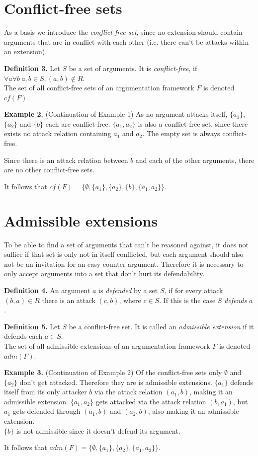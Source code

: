 \documentclass[draft,final]{vutinfth} %
\newcommand{\hl}{\par\vspace{6pt}} %
\newcommand{\cl}{\par\vspace{12pt}} %
\begin{document}
\section{Conflict-free sets}

As a basis we introduce the \emph{conflict-free set}, since no extension should contain arguments that are in conflict with each other (i.e. there can't be attacks within an extension).\cl

\textbf{Definition 3.} Let $S$ be a set of arguments. It is \emph{conflict-free}, if $\forall a \forall b\ a,b\in S, (a,b)\notin R$.\\
The set of all conflict-free sets of an argumentation framework $F$ is denoted $cf(F)$.\cl

\textbf{Example 2.} (Continuation of Example 1) As no argument attacks itself, $\{a_1\}$, $\{a_2\}$ and $\{b\}$ each are conflict-free. $\{a_1,a_2\}$ is also a conflict-free set, since there exists no attack relation containing $a_1$ and $a_2$. The empty set is always conflict-free.\hl
Since there is an attack relation between $b$ and each of the other arguments, there are no other conflict-free sets.\hl
It follows that $cf(F)=\{\emptyset,\{a_1\},\{a_2\},\{b\},\{a_1,a_2\}\}$.\cl

\section{Admissible extensions}

To be able to find a set of arguments that can't be reasoned against, it does not suffice if that set is only not in itself conflicted, but each argument should also not be an invitation for an easy counter-argument. Therefore it is necessary to only accept arguments into a set that don't hurt its defendability.\cl

\textbf{Definition 4.} An argument $a$ is \emph{defended} by a set $S$, if for every attack $(b,a)\in R$ there is an attack $(c,b)$, where $c\in S$. If this is the case $S$ \emph{defends} $a$.\cl

\textbf{Definition 5.} Let $S$ be a conflict-free set. It is called an \emph{admissible extension} if it defends each $a\in S$.\\
The set of all admissible extensions of an argumentation framework $F$ is denoted $adm(F)$.\cl

\textbf{Example 3.} (Continuation of Example 2) Of the conflict-free sets only \(\emptyset\) and $\{a_2\}$ don't get attacked. Therefore they are is admissible extensions. $\{a_1\}$ defends itself from its only attacker $b$ via the attack relation $(a_1,b)$, making it an admissible extension. $\{a_1,a_2\}$ gets attacked via the attack relation $(b,a_1)$, but $a_1$ gets defended through $(a_1,b)$ and $(a_2,b)$, also making it an admissible extension.\\
$\{b\}$ is not admissible since it doesn't defend its argument.\hl
It follows that $adm(F)=\{\emptyset,\{a_1\},\{a_2\},\{a_1,a_2\}\}$.\cl
\end{document}

